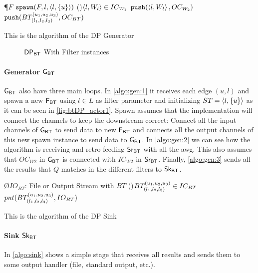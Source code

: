 \begin{algorithm}
\P{$F$}
{$\mathtt{spawn}(F, l, \left\langle l, \{u\} \right\rangle)$ \label{algo:gen:1}
}
\ForAll(){$\left\langle l, W_l \right\rangle \in IC_{W_1}$}
{$\mathtt{push}(\left\langle l, W_l \right\rangle, OC_{W_2})$ \label{algo:gen:2}
}
{$\mathtt{push}(BT_{(l_1, l_2,l_3)}^{(u_1, u_2, u_3)}, OC_{BT})$ \label{algo:gen:3}
}
\caption{This is the algorithm of the DP Generator}
\label{algo:gen}
\end{algorithm}

\begin{figure}[h]
\centering  
{}
\caption{$\mathsf{DP_{BT}}$ With Filter instances}
\label{fig:btDP_actor1}
\end{figure}

\paragraph{Generator $\mathsf{G_{BT}}$} $\mathsf{G_{BT}}$ also have three main loops. In \autoref{algo:gen:1} it receives each edge $(u,l)$ and 
spawn a new $\mathsf{F_{BT}}$ using $l \in L$ as filter parameter and initializing $ST = \left\langle l, \{u\} \right\rangle$ as it can be seen in \autoref{fig:btDP_actor1}. 
Spawn assumes that the implementation will connect the channels to keep the downstream correct: Connect all the input channels
of $\mathsf{G_{BT}}$ to send data to new $\mathsf{F_{BT}}$ and connects all the output channels of this new spawn instance to send data to $\mathsf{G_{BT}}$.
In \autoref{algo:gen:2} we can see how the algorithm is receiving and retro feeding $\mathsf{Sr_{BT}}$ with all the \acrshort{awg}. This also assumes that $OC_{W2}$ in $\mathsf{G_{BT}}$ 
is connected with $IC_{W2}$ in $\mathsf{Sr_{BT}}$.
Finally, \autoref{algo:gen:3} sends all the results that $Q$ matches in the different filters to $\mathsf{Sk_{BT}}$.

\begin{algorithm}
\O{$IO_{BT}$: File or Output Stream with $BT$}
\ForAll(){$BT_{(l_1, l_2,l_3)}^{(u_1, u_2, u_3)} \in IC_{BT}$}
{$put(BT_{(l_1, l_2,l_3)}^{(u_1, u_2, u_3)}, IO_{BT})$
}
\caption{This is the algorithm of the DP Sink}
\label{algo:sink}
\end{algorithm}

\paragraph{Sink $\mathsf{Sk_{BT}}$} In \autoref{algo:sink} shows a simple stage that receives all results and sends them to some output handler (file, standard output, etc.). 

